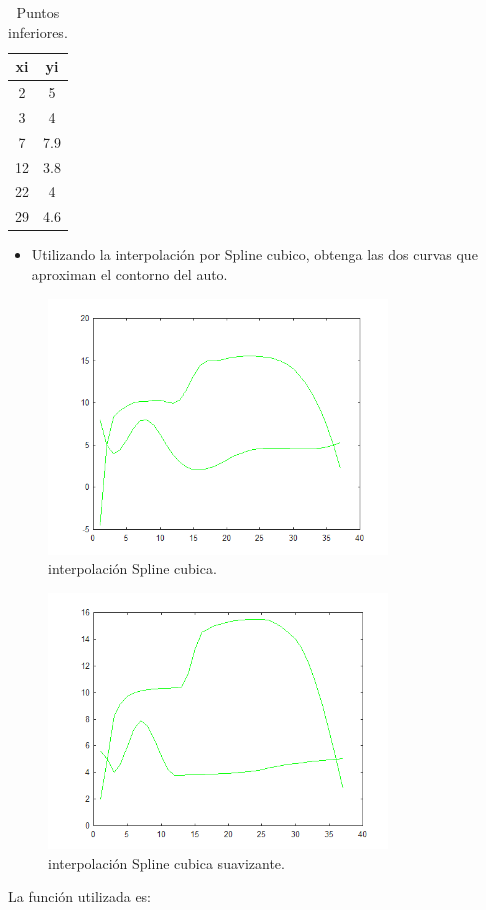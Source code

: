 \documentclass{udpreport}
\begin{document}
\begin{enumerate}
 \begin{table}[H]
    \centering
        \begin{tabular} { |c|c|}
        
        \hline
        xi  &  yi\\
        \hline
        2 &  5       \\
         \hline
        3 &  4        \\
         \hline
        7 &  7.9        \\
         \hline
        12 &  3.8        \\
         \hline
        22 &  4        \\
         \hline
        29 & 4.6        \\
        \hline
        \end{tabular}
        \caption{Puntos inferiores.}
    \end{table}
 \begin{itemize}
\item Utilizando la interpolación por Spline cubico, obtenga las dos curvas que aproximan el contorno del auto.
\end{itemize}

\begin{figure}[H]
    \centering
    \includegraphics[width=9cm]{interp_spline}
    \caption{interpolación Spline cubica.} \label{fig:interp_spline}
\end{figure}

\begin{figure}[H]
    \centering
    \includegraphics[width=9cm]{interp_spline_csaps}
    \caption{interpolación Spline cubica suavizante.} \label{fig:interp_spline_csaps}
\end{figure}
\newpage
La función utilizada es:
 

\end{enumerate}
\end{document}
